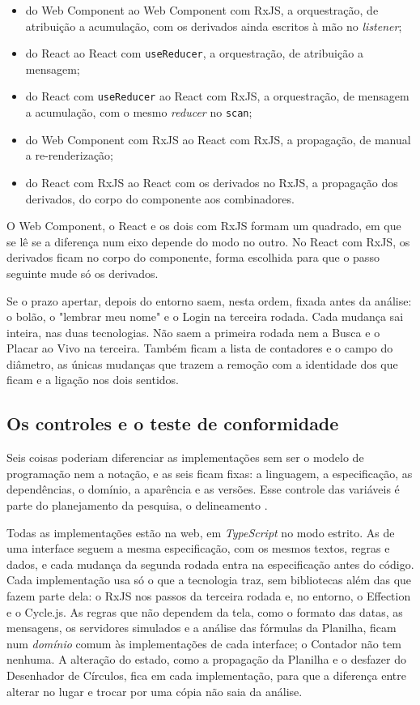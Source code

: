 \begin{itemize}
\item do Web Component ao Web Component com RxJS, a orquestração, de
atribuição a acumulação, com os derivados ainda escritos à mão no
\emph{listener};
\item do React ao React com \texttt{useReducer}, a orquestração, de atribuição a
mensagem;
\item do React com \texttt{useReducer} ao React com RxJS, a orquestração, de
mensagem a acumulação, com o mesmo \emph{reducer} no \texttt{scan};
\item do Web Component com RxJS ao React com RxJS, a propagação, de manual
a re-renderização;
\item do React com RxJS ao React com os derivados no RxJS, a propagação dos
derivados, do corpo do componente aos combinadores.
\end{itemize}

O Web Component, o React e os dois com RxJS formam um quadrado, em que
se lê se a diferença num eixo depende do modo no outro.
No React com RxJS, os derivados ficam no corpo do componente, forma
escolhida para que o passo seguinte mude só os derivados.

Se o prazo apertar, depois do entorno saem, nesta ordem, fixada antes
da análise: o bolão, o "lembrar meu nome" e o Login na terceira rodada.
Cada mudança sai inteira, nas duas tecnologias.
Não saem a primeira rodada nem a Busca e o Placar ao Vivo na terceira.
Também ficam a lista de contadores e o campo do diâmetro, as únicas
mudanças que trazem a remoção com a identidade dos que ficam e a
ligação nos dois sentidos.
\subsection{Os controles e o teste de conformidade}
\label{sec:os-controles-e-o-teste-de-conformidade}

Seis coisas poderiam diferenciar as implementações sem ser o modelo de
programação nem a notação, e as seis ficam fixas: a linguagem, a
especificação, as dependências, o domínio, a aparência e as versões.
Esse controle das variáveis é parte do planejamento da pesquisa, o
delineamento \cite[p. 54]{prodanov2013}.

Todas as implementações estão na web, em \emph{TypeScript} no modo estrito.
As de uma interface seguem a mesma especificação, com os mesmos textos,
regras e dados, e cada mudança da segunda rodada entra na especificação
antes do código.
Cada implementação usa só o que a tecnologia traz, sem bibliotecas além
das que fazem parte dela: o RxJS nos passos da terceira rodada e, no
entorno, o Effection e o Cycle.js.
As regras que não dependem da tela, como o formato das datas, as
mensagens, os servidores simulados e a análise das fórmulas da
Planilha, ficam num \emph{domínio} comum às implementações de cada
interface; o Contador não tem nenhuma.
A alteração do estado, como a propagação da Planilha e o desfazer do
Desenhador de Círculos, fica em cada implementação, para que a
diferença entre alterar no lugar e trocar por uma cópia não saia da
análise.

